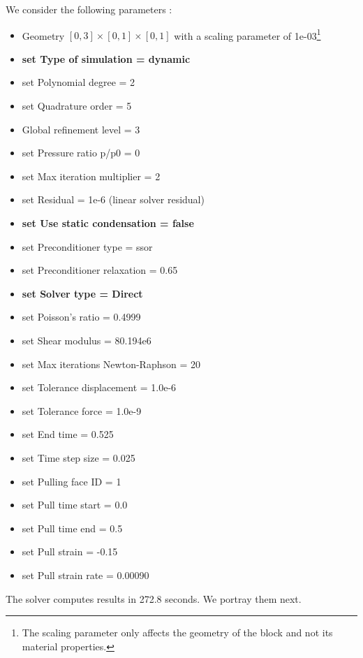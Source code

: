 \documentclass[letterpaper,11pt,oneside,titlepage]{report}
\begin{document}
{We consider the following parameters :
\begin{itemize}
  \item Geometry $[0,3] \times [0,1] \times [0,1]$ with a scaling parameter of 1e-03\footnote{The scaling parameter only affects the geometry of the block and not its material properties.}
  \item \textbf{set Type of simulation = dynamic}
  \item set Polynomial degree = 2
  \item set Quadrature order  = 5
  \item Global refinement level = 3
  \item set Pressure ratio p/p0 = 0 
  \item set Max iteration multiplier = 2
  \item set Residual                 = 1e-6 (linear solver residual)
  \item \textbf{set Use static condensation = false}
  \item set Preconditioner type  = ssor
  \item set Preconditioner relaxation  = 0.65
  \item \textbf{set Solver type              = Direct}
  \item set Poisson's ratio = 0.4999
  \item set Shear modulus   = 80.194e6
  \item set Max iterations Newton-Raphson = 20
  \item set Tolerance displacement        = 1.0e-6
  \item set Tolerance force               = 1.0e-9
  \item set End time       = 0.525
  \item set Time step size = 0.025
  \item set Pulling face ID  = 1
  \item set Pull time start  = 0.0
  \item set Pull time end    = 0.5
  \item set Pull strain      = -0.15
  \item set Pull strain rate = 0.00090
\end{itemize}

The solver computes results in 272.8 seconds. We portray them next.

}
\end{document}
